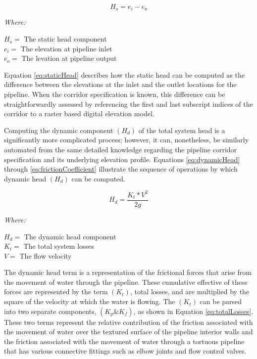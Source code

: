        \begin{equation}
          H_s = e_{i} - e_{o}  
          \label{eq:staticHead}
       \end{equation}
      
       \noindent \textit{Where:} \hfill

       \begin{center}
           $H_s = $ The static head component \\
           $e_i = $ The elevation at pipeline inlet \\
           $e_o = $ The levation at pipeline output \\
       \end{center}

Equation \ref{eq:staticHead} describes how the static head can be computed as the difference between the elevations at the inlet and the outlet locations for the pipeline. When the corridor specification is known, this difference can be straightforwardly assessed by referencing the first and last subscript indices of the corridor to a raster based digital elevation model.

Computing the dynamic component $(H_d)$ of the total system head is a significantly more complicated process; however, it can, nonetheless, be similarly automated from the same detailed knowledge regarding the pipeline corridor specification and its underlying elevation profile. Equations \ref{eq:dynamicHead} through \ref{eq:frictionCoefficient} illustrate the sequence of operations by which dynamic head $(H_d)$ can be computed. 

       \begin{equation}
          H_d = \frac{K_{t} * V^2}{2g}
          \label{eq:dynamicHead}
       \end{equation}
       
       \noindent \textit{Where:} \hfill
       
       \begin{center}
           $H_d = $ The dynamic head component \\
           $K_t = $ The total system losses \\
           $V = $ The flow velocity \\
       \end{center}
       
The dynamic head term is a representation of the frictional forces that arise from the movement of water through the pipeline. These cumulative effective of these forces are represented by the term $(K_t)$, total losses, and are multiplied by the square of the velocity at which the water is flowing. The $(K_t)$ can be parsed into two separate components, $(K_p \& K_f)$, as shown in Equation \ref{eq:totalLosses}. These two terms represent the relative contribution of the friction associated with the movement of water over the textured surface of the pipeline interior walls and the friction associated with the movement of water through a tortuous pipeline that has various connective fittings such as elbow joints and flow control valves. 

